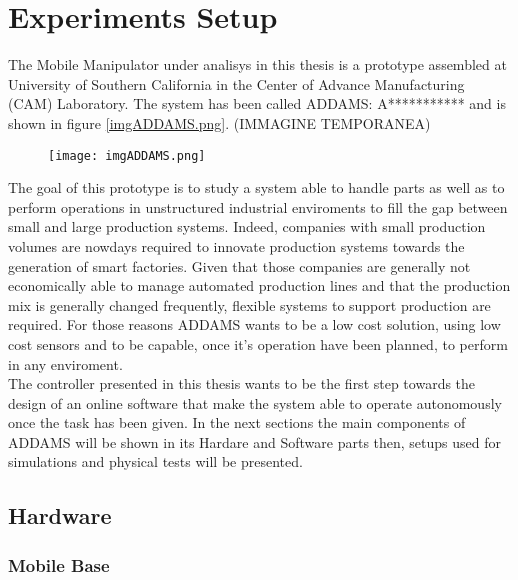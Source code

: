 
\chapter{Experiments Setup}
\label{chapter6}

The Mobile Manipulator under analisys in this thesis is a prototype assembled at University of Southern California in the Center of Advance Manufacturing (CAM) Laboratory. The system has been called ADDAMS: A*********** and is shown in figure \ref{imgADDAMS.png}. (IMMAGINE TEMPORANEA)

\begin{figure}[h] \label{imgADDAMS1}
	\begin{center} 
		\texttt{[image: imgADDAMS.png]}
		\centering
	\end{center}
\end{figure}

 The goal of this prototype is to study a system able to handle parts as well as to perform operations in unstructured industrial enviroments to fill the gap between small and large production systems. Indeed, companies with small production volumes are nowdays required to innovate production systems towards the generation of smart factories. Given that those companies are generally not economically able to manage automated production lines and that the production mix is generally changed frequently, flexible systems to support production are required. For those reasons ADDAMS wants to be a low cost solution, using low cost sensors and to be capable, once it's operation have been planned, to perform in any enviroment. \\

The controller presented in this thesis wants to be the first step towards the design of an online software that make the system able to operate autonomously once the task has been given. In the next sections the main components of ADDAMS will be shown in its Hardare and Software parts then, setups used for simulations and physical tests will be presented. 



\section{Hardware}

\subsection{Mobile Base}

